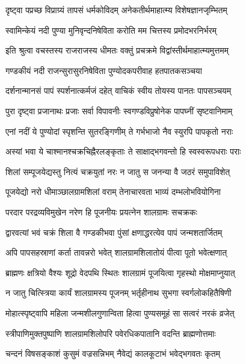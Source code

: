 \twolineshloka
{दृष्ट्वा पप्रच्छ विप्राग्र्यं तापसं धर्मकोविदम्}
{अनेकतीर्थमाहात्म्य विशेषज्ञानजृम्भितम्}%

\twolineshloka
{स्वामिन्केयं नदी पुण्या मुनिवृन्दनिषेविता}
{करोति मम चित्तस्य प्रमोदभरनिर्भरम्}%

\twolineshloka
{इति श्रुत्वा वचस्तस्य राजराजस्य धीमतः}
{वक्तुं प्रचक्रमे विद्वांस्तीर्थमाहात्म्यमुत्तमम्}%


\twolineshloka
{गण्डकीयं नदी राजन्सुरासुरनिषेविता}
{पुण्योदकपरीवाह हतपातकसञ्चया}%

\twolineshloka
{दर्शनान्मानसं पापं स्पर्शनात्कर्मजं दहेत्}
{वाचिकं स्वीय तोयस्य पानतः पापसञ्चयम्}%

\twolineshloka
{पुरा दृष्ट्वा प्रजानाथः प्रजाः सर्वा विपावनीः}
{स्वगण्डविप्रुषोनेक पापघ्नीं सृष्टवानिमाम्}%

\twolineshloka
{एनां नदीं ये पुण्योदां स्पृशन्ति सुतरङ्गिणीम्}
{ते गर्भभाजो नैव स्युरपि पापकृतो नराः}%

\twolineshloka
{अस्यां भवा ये चाश्मानश्चक्रचिह्नैरलङ्कृताः}
{ते साक्षाद्भगवन्तो हि स्वस्वरूपधराः पराः}%

\twolineshloka
{शिलां सम्पूजयेद्यस्तु नित्यं चक्रयुतां नरः}
{न जातु स जनन्या वै जठरं समुपाविशेत्}%

\twolineshloka
{पूजयेद्यो नरो धीमाञ्छालग्रामशिलां वराम्}
{तेनाचारवता भाव्यं दम्भलोभवियोगिना}%

\twolineshloka
{परदार परद्रव्यविमुखेन नरेण हि}
{पूजनीयः प्रयत्नेन शालग्रामः सचक्रकः}%

\twolineshloka
{द्वारवत्यां भवं चक्रं शिला वै गण्डकीभवा}
{पुंसां क्षणाद्धरत्येव पापं जन्मशतार्जितम्}%

\twolineshloka
{अपि पापसहस्राणां कर्ता तावन्नरो भवेत्}
{शालग्रामशिलातोयं पीत्वा पूतो भवेत्क्षणात्}%

\twolineshloka
{ब्राह्मणः क्षत्रियो वैश्यः शूद्रो वेदपथि स्थितः}
{शालग्रामं पूजयित्वा गृहस्थो मोक्षमाप्नुयात्}%

\twolineshloka
{न जातु चित्स्त्रिया कार्यं शालग्रामस्य पूजनम्}
{भर्तृहीनाथ सुभगा स्वर्गलोकहितैषिणी}%

\twolineshloka
{मोहात्स्पृष्ट्वापि महिला जन्मशीलगुणान्विता}
{हित्वा पुण्यसमूहं सा सत्वरं नरकं व्रजेत्}%

\twolineshloka
{स्त्रीपाणिमुक्तपुष्पाणि शालग्रामशिलोपरि}
{पवेरधिकपातानि वदन्ति ब्राह्मणोत्तमाः}%

\twolineshloka
{चन्दनं विषसङ्काशं कुसुमं वज्रसन्निभम्}
{नैवेद्यं कालकूटाभं भवेद्भगवतः कृतम्}%

